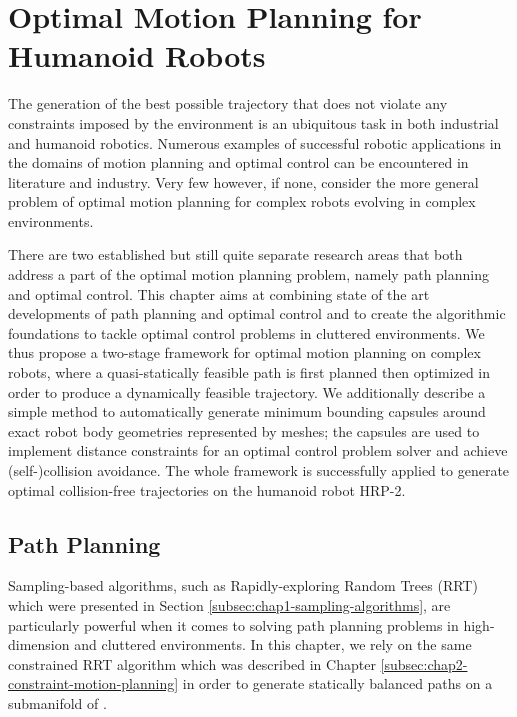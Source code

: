 \chapter{Optimal Motion Planning for Humanoid Robots}
\label{chap:optimal-motion-planning}

The generation of the best possible trajectory that does not violate
any constraints imposed by the environment is an ubiquitous task in
both industrial and humanoid robotics. Numerous examples of successful
robotic applications in the domains of motion planning and optimal
control can be encountered in literature and industry. Very few
however, if none, consider the more general problem of optimal motion
planning for complex robots evolving in complex environments.

There are two established but still quite separate research areas that
both address a part of the optimal motion planning problem, namely
path planning and optimal control. This chapter aims at combining
state of the art developments of path planning and optimal control and
to create the algorithmic foundations to tackle optimal control
problems in cluttered environments. We thus propose a two-stage
framework for optimal motion planning on complex robots, where a
quasi-statically feasible path is first planned then optimized in
order to produce a dynamically feasible trajectory. We additionally
describe a simple method to automatically generate minimum bounding
capsules around exact robot body geometries represented by meshes; the
capsules are used to implement distance constraints for an optimal
control problem solver and achieve (self-)collision avoidance. The
whole framework is successfully applied to generate optimal
collision-free trajectories on the humanoid robot HRP-2.

\section{Path Planning}

Sampling-based algorithms, such as Rapidly-exploring Random Trees
(RRT) which were presented in Section
\ref{subsec:chap1-sampling-algorithms}, are particularly powerful when
it comes to solving path planning problems in
high-dimension {\cspace}\thinspace and cluttered environments. In this
chapter, we rely on the same constrained RRT algorithm which was
described in Chapter \ref{subsec:chap2-constraint-motion-planning} in
order to generate statically balanced paths on a submanifold
of {\cspace}.

